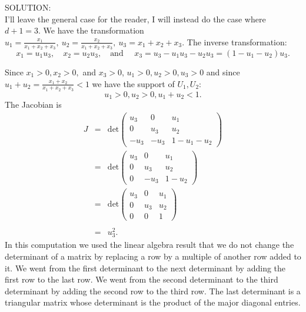 \documentclass[12pt]{article}
\begin{document}
\noindent SOLUTION:\\
I'll leave the general case for the reader, I will instead do the case where $d+1=3$. We have the transformation $u_1=\frac {x_1}{x_1+x_2+x_3},\ u_2=\frac {x_2}{x_1+x_2+x_3},\ u_3=x_1+x_2+x_3$. The
inverse transformation:
$$x_1=u_1u_3,\quad x_2=u_2u_3,\quad \mbox{and }\quad x_3=u_3-u_1u_3-u_2u_3=(1-u_1-u_2)u_3.$$


\newpage

\noindent Since $x_1>0, x_2>0,$ and $x_3>0$, $u_1>0, u_2>0, u_3>0$ and since $u_1+u_2=\frac {x_1+x_2}{x_1+x_2+x_3}<1$ we have the support of $U_1,U_2$:
$$u_1>0, u_2>0, u_1+u_2<1.$$
The Jacobian is
\begin{eqnarray*}
J &=& \mbox{det}\left(\begin{array}{ccc} u_3 & 0 & u_1 \\ 0 & u_3 & u_2\\ -u_3 & -u_3 & 1-u_1-u_2  \end{array}\right) \\
&=& \mbox{det}\left(\begin{array}{ccc} u_3 & 0 & u_1 \\ 0 & u_3 & u_2\\ 0 & -u_3 & 1-u_2  \end{array}\right)\\
&=& \mbox{det}\left(\begin{array}{ccc} u_3 & 0 & u_1 \\ 0 & u_3 & u_2\\ 0 & 0 & 1  \end{array}\right)\\
& &\\
&=& u_3^2.
\end{eqnarray*}
In this computation we used the linear algebra result that we do not
change the determinant of a matrix by replacing a row by a multiple of
another row added to it. We went from the first determinant
to the next determinant by adding the first row to the last row.
We went from the second determinant to the third determinant by adding the second row to the third row. The last determinant is a triangular matrix whose determinant is the product of the major
diagonal entries.
\end{document}
